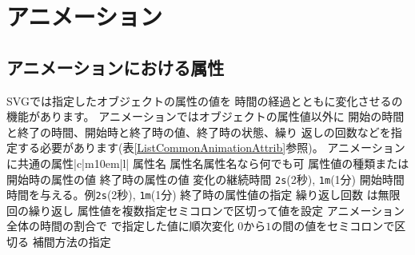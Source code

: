 %
%
\chapter{アニメーション}\label{ChapAnimation}
\section{アニメーションにおける属性}
SVGでは指定したオブジェクトの属性の値を
時間の経過とともに変化させるの機能があります。
アニメーションではオブジェクトの属性値以外に
開始の時間と終了の時間、開始時と終了時の値、終了時の状態、繰り
返しの回数などを指定する必要があります(表\ref{ListCommonAnimationAttrib}参照)。
      {アニメーションに共通の属性}{|c|m{10em}|l|}
{{属性名}{}
         {}
{}{属性名}{属性名なら何でも可}
{}{属性値の種類}{または}
{}{開始時の属性の値}{\relax}
{}{終了時の属性の値}{\relax}
{}{変化の継続時間}
       {\texttt{2s}(2秒), \texttt{1m}(1分)}
{}{開始時間}
       {時間を与える。例\texttt{2s}(2秒), \texttt{1m}(1分)}
{}{終了時の属性値の指定}
    {}
{}{繰り返し回数}
    {は無限回の繰り返し}
{}{属性値を複数指定}{セミコロンで区切って値を設定}
{}{アニメーション全体の時間の割合で
  で指定した値に順次変化}
  {$0$から$1$の間の値をセミコロンで区切る}
{}{補間方法の指定}
         {}
}

